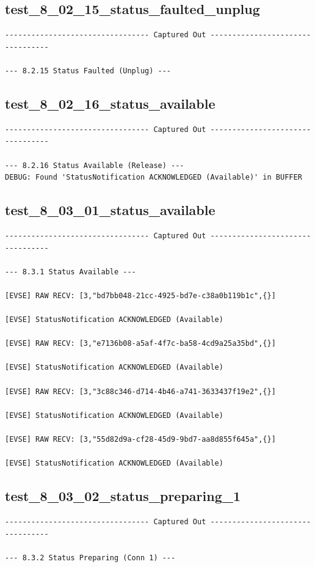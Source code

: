 \documentclass{article}
\begin{document}
\subsection*{test\_8\_02\_15\_status\_faulted\_unplug}
\begin{lstlisting}
--------------------------------- Captured Out ---------------------------------

--- 8.2.15 Status Faulted (Unplug) ---
\end{lstlisting}
\subsection*{test\_8\_02\_16\_status\_available}
\begin{lstlisting}
--------------------------------- Captured Out ---------------------------------

--- 8.2.16 Status Available (Release) ---
DEBUG: Found 'StatusNotification ACKNOWLEDGED (Available)' in BUFFER
\end{lstlisting}
\subsection*{test\_8\_03\_01\_status\_available}
\begin{lstlisting}
--------------------------------- Captured Out ---------------------------------

--- 8.3.1 Status Available ---

[EVSE] RAW RECV: [3,"bd7bb048-21cc-4925-bd7e-c38a0b119b1c",{}]

[EVSE] StatusNotification ACKNOWLEDGED (Available)

[EVSE] RAW RECV: [3,"e7136b08-a5af-4f7c-ba58-4cd9a25a35bd",{}]

[EVSE] StatusNotification ACKNOWLEDGED (Available)

[EVSE] RAW RECV: [3,"3c88c346-d714-4b46-a741-3633437f19e2",{}]

[EVSE] StatusNotification ACKNOWLEDGED (Available)

[EVSE] RAW RECV: [3,"55d82d9a-cf28-45d9-9bd7-aa8d855f645a",{}]

[EVSE] StatusNotification ACKNOWLEDGED (Available)
\end{lstlisting}
\subsection*{test\_8\_03\_02\_status\_preparing\_1}
\begin{lstlisting}
--------------------------------- Captured Out ---------------------------------

--- 8.3.2 Status Preparing (Conn 1) ---
\end{lstlisting}
\end{document}
